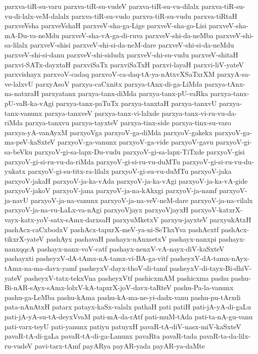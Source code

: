 {parxva-tiR-su-varu
parxva-tiR-su-vudeV
parxva-tiR-su-vu-dilalx
parxva-tiR-su-vu-di-lalx-veM-dalalx
parxva-tiR-su-vudo
parxva-tiR-su-vudu
parxva-tiRtaH
parxveVsha
parxveVshaH
parxveV-sha-ga-Lige
parxveV-sha-go-Lisi
parxveV-sha-mA-Du-va-neMdu
parxveV-sha-vA-ga-di-ruva
parxveV-shi-da-neMba
parxveV-shi-sa-lilalx
parxveV-shisi
parxveV-shi-si-da-neM-dare
parxveV-shi-si-da-neMdu
parxveV-shi-si-danu
parxveV-shi-sidudx
parxveV-shi-su-vudu
parxveV-shitaH
parxvi-SATx-dayxtaH
parxviSaTx
parxviSaTxH
parxvi-layaH
parxvi-liV-yateV
parxvishayx
parxvoV-cadaq
parxvoV-ca-daq-tA-ya-nAtxvXSaTxrXM
parxyA-sa-ve-lalxvU
parxyAsoV
parxya-caCxnitx
parxya-tAnx-di-ga-LiMda
parxya-tAnx-na-natxraH
parxyatanx
parxya-tanx-diMda
parxya-tanx-pU-vaRka
parxya-tanx-pU-vaR-ka-vAgi
parxya-tanx-paTuTx
parxya-tanxtaH
parxya-tanxvU
parxya-tanx-vanunx
parxya-tanxveV
parxya-tanx-vi-lalxde
parxya-tanx-vi-ru-vu-da-riMda
parxya-tanxvu
parxya-tayxteV
parxya-tinx-side
parxya-tinx-su-varo
parxya-yA-vanAyxM
parxyoVga
parxyoV-ga-diMda
parxyoV-gakekx
parxyoV-ga-ma-peV-kaSxteV
parxyoV-ga-vanunx
parxyoV-ga-vide
parxyoV-gavu
parxyoV-gi-sa-beVku
parxyoV-gi-sa-lapx-Du-vudu
parxyoV-gi-sa-lapx-TiTxde
parxyoV-gisi
parxyoV-gi-si-ru-vu-da-riMda
parxyoV-gi-si-ru-vu-duMTu
parxyoV-gi-si-ru-vu-du-yukatx
parxyoV-gi-su-titx-ra-lilalx
parxyoV-gi-su-vu-duMTu
parxyoV-jaka
parxyoV-jakaH
parxyoV-ja-ka-vAda
parxyoV-ja-ka-vAgi
parxyoV-ja-ka-vA-gide
parxyoV-jakoV
parxyoV-jana
parxyoV-ja-na-kAkxgi
parxyoV-ja-namf
parxyoV-ja-navU
parxyoV-ja-na-vanunx
parxyoV-ja-na-veV-neM-dare
parxyoV-ja-na-vilalx
parxyoV-ja-na-vu-LaLx-va-nAgi
parxyoVjayx
parxyoVjayxH
parxyoV-katxrX-vayx-katx-yoV-satx-sAmx-darxsaH
parxyuMketxV
parxyu-jayxteV
parxyukAtxH
pashAcx-caCxbodxV
pashAcx-tapxrX-meV-ya-ni-SeThxYva
pashAcxtf
pashAcx-tikxrX-yateV
pashAyx
pashavaH
pashayx-nAnxsetxV
pashayx-nanxpi
pashayx-nanxqqcA
pashayx-nanx-voV-catf
pashayx-nenxV-vA-nayx-diV-kaSxteV
pashayxti
pasheyxV-dA-tAmx-nA-tamx-vi-BA-ga-vitf
pasheyxV-dA-tamx-nAyx-tAmx-na-ma-davx-yamf
pasheyxV-dayx-thoV-di-tamf
pasheyxV-di-tayx-Bi-dhiV-yateV
pasheyxV-tatx-tekxVna
pasheyxVtf
pashicxmAM
pashicxma
pashu
pashu-Bi-nAR-sAyx-sAmx-lolxV-kA-tapxrX-joV-davx-taRteV
pashu-Pa-la-vanunx
pashu-ga-LeMba
pashu-kAma
pashu-kA-ma-ne-yi-dadx-vanu
pashu-pu-tArxdi
pata-nAnAtxH
patarx
patayx-kaSx-valalx
pathaH
pati
patiH
pati-jA-yA-di-gaLu
pati-jA-yA-su-tA-deyxVvaM
pati-mA-da-rAtf
pati-muM-tAda
pati-ta-nA-gu-vanu
pati-varx-teyU
pati-yanunx
patiyu
patuyxH
pavaR-tA-diV-nasx-miV-kaSxteV
pavaR-tA-di-gaLa
pavaR-tA-di-ga-Lanunx
pavaRta
pavaR-tada
pavaR-ta-da-lilx-ru-vudeV
pavi-tarx-tAmf
payARya
payAR-yada
payAR-ya-daMte
}
